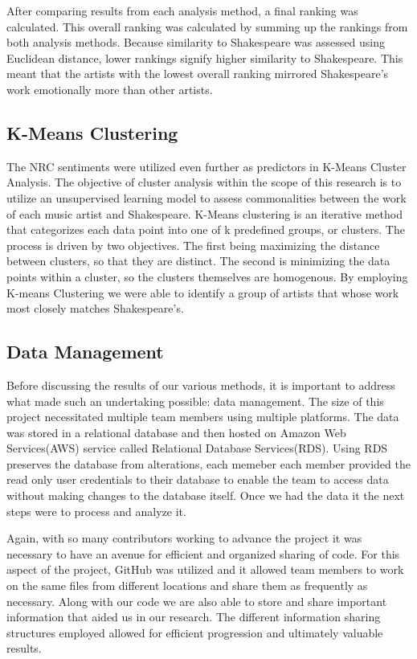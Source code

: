 \documentclass[10pt,a4paper]{article}
\begin{document}
\noindent After comparing results from each analysis method, a final ranking was calculated. This overall ranking was calculated by summing up the rankings from both analysis methods. Because similarity to Shakespeare was assessed using Euclidean distance, lower rankings signify higher similarity to Shakespeare. This meant that the artists with the lowest overall ranking mirrored Shakespeare’s work emotionally more than other artists.

\subsection{K-Means Clustering}
The NRC sentiments were utilized even further as predictors in K-Means Cluster Analysis. The objective of cluster analysis within the scope of this research is to utilize an unsupervised learning model \cite{k-means} to assess commonalities between the work of each music artist and Shakespeare. K-Means clustering is an iterative method that categorizes each data point into one of k predefined groups, or clusters. The process is driven by two objectives. The first being maximizing the distance between clusters, so that they are distinct. The second is minimizing the data points within a cluster, so the clusters themselves are homogenous. \cite{k-means} By employing K-means Clustering we were able to identify a group of artists that whose work most closely matches Shakespeare’s. 

\subsection{Data Management}
Before discussing the results of our various methods, it is important to address what made such an undertaking possible: data management.  The size of this project necessitated multiple team members using multiple platforms. The data was stored in a relational database and then hosted on  Amazon Web Services(AWS) service called Relational Database Services(RDS). Using RDS preserves the database from alterations, each memeber each member provided the read only user credentials to their database to enable the team to access data without making changes to the database itself. Once we had the data it the next steps were to process and analyze it. 

\noindent Again, with so many contributors working to advance the project it was necessary to have an avenue for efficient and organized sharing of code. For this aspect of the project, GitHub was utilized and it allowed team members to work on the same files from different locations and share them as frequently as necessary. Along with our code we are also able to store and share important information that aided us in our research. The different information sharing structures employed allowed for efficient progression and ultimately valuable results. 
\end{document}

